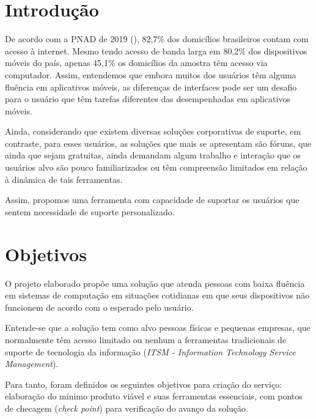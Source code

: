 \documentclass[
    12pt,               %
    openright,          %
    oneside,
    a4paper,            %
    english,            %
    brazil              %
   ]{ifsp-spo-inf-ctds}
\begin{document}
\frenchspacing 

\pretextual

\imprimirfolhaderosto

\textual

\chapter[Introdução]{Introdução}

	De acordo com a PNAD de 2019 (\citeauthor{PNAD:2019}), 82,7\% dos domicílios brasileiros contam com acesso à internet. Mesmo tendo acesso de banda larga em 80,2\% dos dispositivos móveis do país, apenas 45,1\% os domicílios da amostra têm acesso via computador. Assim, entendemos que embora muitos dos usuários têm alguma fluência em aplicativos móveis, as diferenças de interfaces pode ser um desafio para o usuário que têm tarefas diferentes das desempenhadas em aplicativos móveis.

	Ainda, considerando que existem diversas soluções corporativas de suporte, em contraste, para esses usuários, as soluções que mais se apresentam são fóruns, que ainda que sejam gratuitas, ainda demandam algum trabalho e interação que os usuários alvo são pouco familiarizados ou têm compreensão limitados em relação à dinâmica de tais ferramentas.

	Assim, propomos uma ferramenta com capacidade de suportar os usuários que sentem necessidade de suporte personalizado.

\chapter[Objetivos]{Objetivos}

	O projeto elaborado propõe uma solução que atenda pessoas com baixa fluência em sistemas de computação em situações cotidianas em que seus dispositivos não funcionem de acordo com o esperado pelo usuário.
	
	Entende-se que a solução tem como alvo pessoas físicas e pequenas empresas, que normalmente têm acesso limitado ou nenhum a ferramentas tradicionais de suporte de tecnologia da informação (\textit{ITSM - Information Technology Service Management}).
	
	Para tanto, foram definidos os seguintes objetivos para criação do serviço: elaboração do mínimo produto viável e suas ferramentas essenciais, com pontos de checagem (\textit{check point}) para verificação do avanço da solução.
\end{document}
